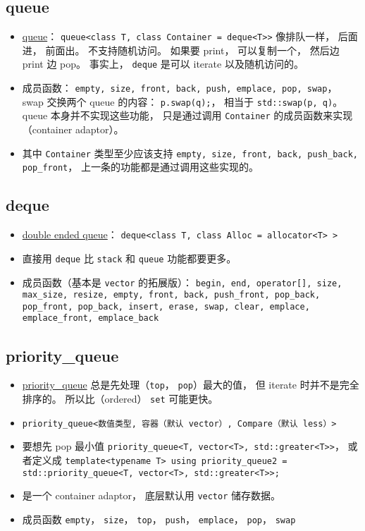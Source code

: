 \subsection{queue}
\begin{itemize}
\item \href{https://cplusplus.com/reference/queue/queue/}{queue}： \verb|queue<class T, class Container = deque<T>>| 像排队一样， 后面进， 前面出。 不支持随机访问。 如果要 print， 可以复制一个， 然后边 print 边 pop。 事实上， \verb|deque| 是可以 iterate 以及随机访问的。
\item 成员函数： \verb|empty, size, front, back, push, emplace, pop, swap|， swap 交换两个 queue 的内容： \verb|p.swap(q);|， 相当于 \verb|std::swap(p, q)|。 queue 本身并不实现这些功能， 只是通过调用 \verb|Container| 的成员函数来实现（container adaptor）。
\item 其中 \verb|Container| 类型至少应该支持 \verb|empty, size, front, back, push_back, pop_front|， 上一条的功能都是通过调用这些实现的。
\end{itemize}

\subsection{deque}
\begin{itemize}
\item \href{https://cplusplus.com/reference/deque/deque/}{double ended queue}： \verb|deque<class T, class Alloc = allocator<T> >|
\item 直接用 \verb|deque| 比 \verb|stack| 和 \verb|queue| 功能都要更多。
\item 成员函数（基本是 \verb|vector| 的拓展版）： \verb|begin, end, operator[], size, max_size, resize, empty, front, back, push_front, pop_back, pop_front, pop_back, insert, erase, swap, clear, emplace, emplace_front, emplace_back|
\end{itemize}

\subsection{priority\_queue}
\begin{itemize}
\item \href{https://cplusplus.com/reference/queue/priority_queue/}{priority\_queue} 总是先处理（\verb|top|， \verb|pop|）最大的值， 但 iterate 时并不是完全排序的。 所以比（ordered） \verb|set| 可能更快。
\item \verb|priority_queue<数值类型, 容器（默认 vector）, Compare（默认 less）>|
\item 要想先 pop 最小值 \verb|priority_queue<T, vector<T>, std::greater<T>>|， 或者定义成 \verb|template<typename T> using priority_queue2 = std::priority_queue<T, vector<T>, std::greater<T>>;|
\item 是一个 container adaptor， 底层默认用 \verb|vector| 储存数据。
\item 成员函数 \verb|empty|， \verb|size|， \verb|top|， \verb|push|， \verb|emplace|， \verb|pop|， \verb|swap|
\end{itemize}



